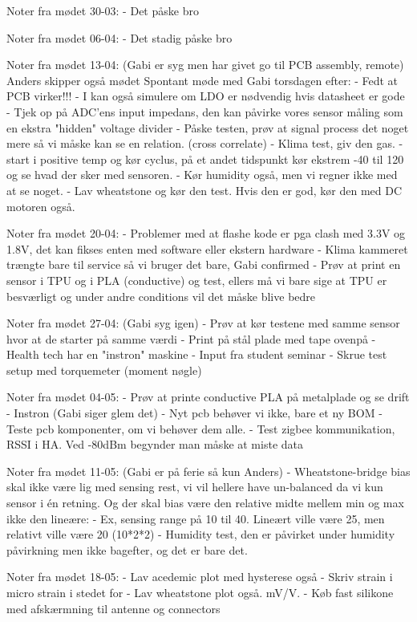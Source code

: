 Noter fra mødet 30-03:
- Det påske bro

Noter fra mødet 06-04:
- Det stadig påske bro

Noter fra mødet 13-04:
(Gabi er syg men har givet go til PCB assembly, remote)
Anders skipper også mødet
Spontant møde med Gabi torsdagen efter:
- Fedt at PCB virker!!!
    - I kan også simulere om LDO er nødvendig hvis datasheet er gode
    - Tjek op på ADC'ens input impedans, den kan påvirke vores sensor måling som en ekstra          "hidden" voltage divider
- Påske testen, prøv at signal process det noget mere så vi måske kan se en relation. (cross        correlate)
- Klima test, giv den gas.
    - start i positive temp og kør cyclus, på et andet tidspunkt kør ekstrem -40 til 120 og se      hvad der sker med sensoren. 
    - Kør humidity også, men vi regner ikke med at se noget.
    - Lav wheatstone og kør den test. Hvis den er god, kør den med DC motoren også.

Noter fra mødet 20-04:
- Problemer med at flashe kode er pga clash med 3.3V og 1.8V, det kan fikses enten med software     eller ekstern hardware
- Klima kammeret trængte bare til service så vi bruger det bare, Gabi confirmed
- Prøv at print en sensor i TPU og i PLA (conductive) og test, ellers må vi bare sige at TPU er     besværligt og under andre conditions vil det måske blive bedre

Noter fra mødet 27-04:
(Gabi syg igen)
- Prøv at kør testene med samme sensor hvor at de starter på samme værdi
- Print på stål plade med tape ovenpå
- Health tech har en "instron" maskine
- Input fra student seminar
    - Skrue test setup med torquemeter (moment nøgle)

Noter fra mødet 04-05:
- Prøv at printe conductive PLA på metalplade og se drift
- Instron (Gabi siger glem det)
- Nyt pcb behøver vi ikke, bare et ny BOM
- Teste pcb komponenter, om vi behøver dem alle.
- Test zigbee kommunikation, RSSI i HA. Ved -80dBm begynder man måske at miste data

Noter fra mødet 11-05:
(Gabi er på ferie så kun Anders)
- Wheatstone-bridge bias skal ikke være lig med sensing rest, vi vil hellere have un-balanced da vi kun sensor i én retning. Og der skal bias være den relative midte mellem min og max ikke den lineære:
    - Ex, sensing range på 10 til 40. Lineært ville være 25, men relativt ville være 20 (10*2*2)
- Humidity test, den er påvirket under humidity påvirkning men ikke bagefter, og det er bare det.

Noter fra mødet 18-05:
- Lav acedemic plot med hysterese også
- Skriv strain i micro strain i stedet for
- Lav wheatstone plot også. mV/V.
- Køb fast silikone med afskærmning til antenne og connectors


